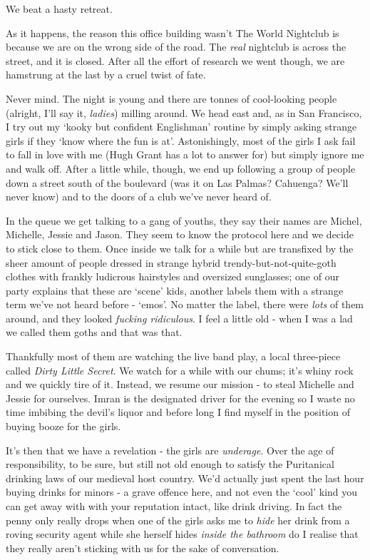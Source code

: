 \documentclass[a5paper,titlepage,11pt,draft]{book}
\begin{document}
We beat a hasty retreat.

As it happens, the reason this office building wasn't The World Nightclub is because we are on the wrong side of the road.  The \emph{real} nightclub is across the street, and it is closed.  After all the effort of research we went though, we are hamstrung at the last by a cruel twist of fate.

Never mind.  The night is young and there are tonnes of cool-looking people (alright, I'll say it, \emph{ladies}) milling around.  We head east and, as in San Francisco, I try out my `kooky but confident Englishman' routine by simply asking strange girls if they `know where the fun is at'.  Astonishingly, most of the girls I ask fail to fall in love with me (Hugh Grant has a lot to answer for) but simply ignore me and walk off.  After a little while, though, we end up following a group of people down a street south of the boulevard (was it on Las Palmas?  Cahuenga?  We'll never know) and to the doors of a club we've never heard of.

In the queue we get talking to a gang of youths, they say their names are Michel, Michelle, Jessie and Jason.  They seem to know the protocol here and we decide to stick close to them.  Once inside we talk for a while but are transfixed by the sheer amount of people dressed in strange hybrid trendy-but-not-quite-goth clothes with frankly ludicrous hairstyles and oversized sunglasses; one of our party explains that these are `scene' kids, another labels them with a strange term we've not heard before - `emos'.  No matter the label, there were \emph{lots} of them around, and they looked \emph{fucking ridiculous}.  I feel a little old - when I was a lad we called them goths and that was that.

Thankfully most of them are watching the live band play, a local three-piece called \emph{Dirty Little Secret}.  We watch for a while with our chums; it's whiny rock and we quickly tire of it.  Instead, we resume our mission - to steal Michelle and Jessie for ourselves.  Imran is the designated driver for the evening so I waste no time imbibing the devil's liquor and before long I find myself in the position of buying booze for the girls.

It's then that we have a revelation - the girls are \emph{underage}.  Over the age of responsibility, to be sure, but still not old enough to satisfy the Puritanical drinking laws of our medieval host country.  We'd actually just spent the last hour buying drinks for minors - a grave offence here, and not even the `cool' kind you can get away with with your reputation intact, like drink driving.  In fact the penny only really drops when one of the girls asks me to \emph{hide} her drink from a roving security agent while she herself hides \emph{inside the bathroom} do I realise that they really aren't sticking with us for the sake of conversation.
\end{document}

